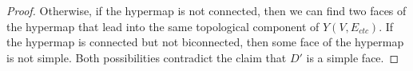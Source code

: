 \begin{proof}
  Otherwise,
  if the hypermap is not connected, then we can find two faces of the hypermap that
  lead into the same topological component of $Y(V,E_{ctc})$.  If the
  hypermap is connected but not biconnected, then some face of the
  hypermap is not simple.  Both possibilities contradict the claim that $D'$
is a simple face.
\end{proof}



%  
%
%
%
%
%
%
%
%
%
%




